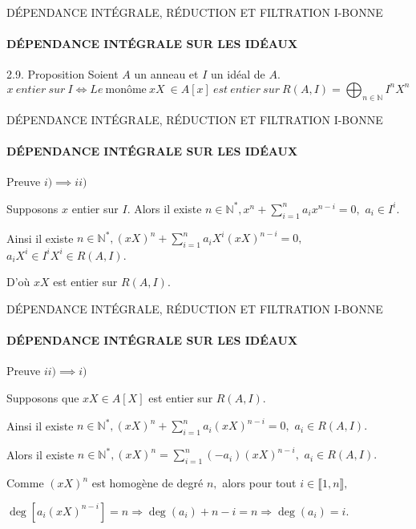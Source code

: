 \documentclass[11pt,a4paper]{beamer}
\begin{document}
\begin{frame}{DÉPENDANCE INTÉGRALE, RÉDUCTION ET FILTRATION I-BONNE}
	\framesubtitle{DÉPENDANCE INTÉGRALE SUR LES IDÉAUX}
	\begin{block}{2.9. Proposition}
		Soient $A$ un anneau et $I$ un idéal de $A$.
		\[ x \ entier \ sur \ I \Longleftrightarrow Le \ \text{monôme} \ xX \ \in A[x] \ est \ entier \ sur \ R(A, I) = \displaystyle \bigoplus_{n \in \mathbb{N}}{I^nX^n} \]
	\end{block}
\end{frame}

\begin{frame}{DÉPENDANCE INTÉGRALE, RÉDUCTION ET FILTRATION I-BONNE}
	\framesubtitle{DÉPENDANCE INTÉGRALE SUR LES IDÉAUX}
	\begin{block}{Preuve}
	$i) \implies ii)$
	
	Supposons $x$ entier sur $I.$ Alors il existe $n\in \mathbb{N}^{\ast },x^{n}+\sum\limits_{i=1}^{n}a_{i}x^{n-i}=0,$ $a_{i}\in I^{i}.$
	
	Ainsi il existe $n\in \mathbb{N}^{\ast },(xX)^{n}+\sum\limits_{i=1}^{n}a_{i}X^{i}(xX)^{n-i}=0,$ $%
	a_{i}X^{i}\in I^{i}X^{i}\in R(A,I).$
	
	D'où  $xX$ est entier sur $R(A,I).$
	\end{block}
\end{frame}

\begin{frame}{DÉPENDANCE INTÉGRALE, RÉDUCTION ET FILTRATION I-BONNE}
	\framesubtitle{DÉPENDANCE INTÉGRALE SUR LES IDÉAUX}
	\begin{block}{Preuve}
		$ii)\implies i)$
	
	Supposons que  $xX\in A[X]$ est entier sur $R(A,I).$
	
	Ainsi il existe $n\in \mathbb{N}^{\ast },(xX)^{n}+\sum\limits_{i=1}^{n}a_{i}(xX)^{n-i}=0,$ $a_{i}\in R(A,I).
	$
	
	Alors il existe $n\in \mathbb{N}^{\ast },(xX)^{n}=\sum\limits_{i=1}^{n}(-a_{i})(xX)^{n-i},$ $a_{i}\in
	R(A,I).$
	
	Comme $(xX)^{n}$ est homogène de degré $n,$ alors pour tout $i\in \llbracket 1, n \rrbracket,$
	
	$\deg [a_{i}(xX)^{n-i}]=n\Rightarrow \deg (a_{i})+n-i=n\Rightarrow \deg
	(a_{i})=i.$
		\end{block}
\end{frame}
\end{document}
